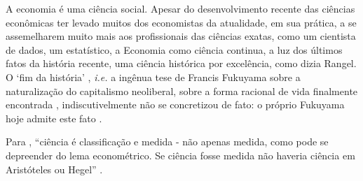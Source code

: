 \documentclass[
	12pt,				%
	oneside,			%
	a4paper,			%
	chapter=TITLE,		%
	section=TITLE,		%
	english,			%
	brazil				%
	]{abntex2}
\begin{document}
A economia é uma ciência social. Apesar do desenvolvimento recente das ciências
econômicas ter levado muitos dos economistas da atualidade, em sua prática, a se
assemelharem muito mais aos profissionais das ciências exatas, como um cientista
de dados, um estatístico, a Economia como ciência continua, a luz dos últimos
fatos da história recente, uma ciência histórica por excelência, como dizia
Rangel. O `fim da história' \autocite{fukuyama}, \emph{i.e.} a ingênua tese de Francis
Fukuyama sobre a naturalização do capitalismo neoliberal, sobre a forma racional
de vida finalmente encontrada \autocite[401]{zizek2011}, indiscutivelmente não se
concretizou de fato: o próprio Fukuyama hoje admite este fato
\autocite{menand_francis_nodate}.

Para \textcite{rangel1956}, ``ciência é classificação e medida - não apenas medida, como
pode se depreender do lema econométrico. Se ciência fosse medida não haveria
ciência em Aristóteles ou Hegel'' \autocite[204]{rangel1956}.
\end{document}
